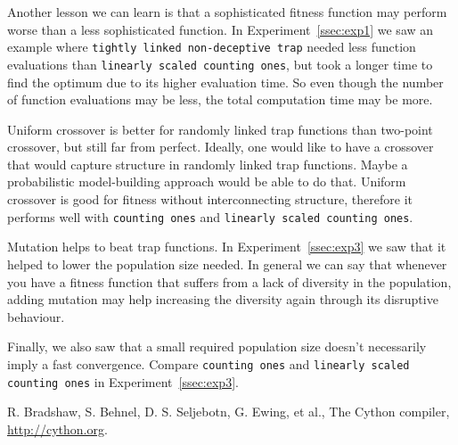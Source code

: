 \documentclass[12pt]{article}
\theoremstyle{definition}
\newcommand{\co}{\texttt{counting ones}}
\newcommand{\lsco}{\texttt{linearly scaled counting ones}}
\newcommand{\tnt}{\texttt{tightly linked non-deceptive trap}}
\begin{document}
Another lesson we can learn is that a sophisticated fitness function may perform worse than a less sophisticated function.
In Experiment~\ref{ssec:exp1} we saw an example where \tnt{} needed less
function evaluations than \lsco{}, but took a longer time to find the optimum due to its higher
evaluation time.
So even though the number of function evaluations may be less, the total computation time
may be more.

Uniform crossover is better for randomly linked trap functions than two-point crossover,
but still far from perfect.
Ideally, one would like to have a crossover that would capture structure in randomly linked
trap functions.
Maybe a probabilistic model-building approach would be able to do that.
Uniform crossover is good for fitness without interconnecting structure,
therefore it performs well with \co{} and \lsco{}.

Mutation helps to beat trap functions.
In Experiment~\ref{ssec:exp3} we saw that it helped to lower the population size needed.
In general we can say that whenever you have a fitness function that suffers from a
lack of diversity in the population, adding mutation may help increasing the diversity again
through its disruptive behaviour.

Finally, we also saw that a small required population size doesn't necessarily imply
a fast convergence.
Compare \co{} and \lsco{} in Experiment~\ref{ssec:exp3}.

\begin{thebibliography}{9}

R. Bradshaw, S. Behnel, D. S. Seljebotn, G. Ewing, et al.,
The Cython compiler, \url{http://cython.org}.

\end{thebibliography}
\end{document}
